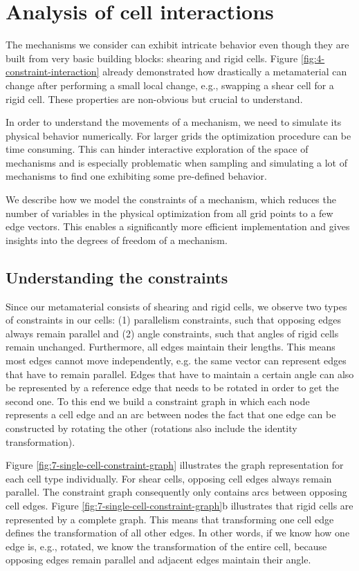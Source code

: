 \section{Analysis of cell interactions}

The mechanisms we consider can exhibit intricate behavior even though they are built from very basic building blocks: shearing and rigid cells. Figure \ref{fig:4-constraint-interaction} already demonstrated how drastically a metamaterial can change after performing a small local change, e.g., swapping a shear cell for a rigid cell. These properties are non-obvious but crucial to understand.

In order to understand the movements of a mechanism, we need to simulate its physical behavior numerically. For larger grids the optimization procedure can be time consuming. This can hinder interactive exploration of the space of mechanisms and is especially problematic when sampling and simulating a lot of mechanisms to find one exhibiting some pre-defined behavior.

We describe how we model the constraints of a mechanism, which reduces the number of variables in the physical optimization from all grid points to a few edge vectors. This enables a significantly more efficient implementation and gives insights into the degrees of freedom of a mechanism.


\subsection{Understanding the constraints}
\label{section:graph}

Since our metamaterial consists of shearing and rigid cells, we observe two types of constraints in our cells: (1) parallelism constraints, such that opposing edges always remain parallel and (2) angle constraints, such that angles of rigid cells remain unchanged. Furthermore, all edges maintain their lengths. 
This means most edges cannot move independently, e.g. the same vector can represent edges that have to remain parallel. Edges that have to maintain a certain angle can also be represented by a reference edge that needs to be rotated in order to get the second one. To this end we build a constraint graph in which each node represents a cell edge and an arc between nodes the fact that one edge can be constructed by rotating the other (rotations also include the identity transformation).

Figure \ref{fig:7-single-cell-constraint-graph} illustrates the graph representation for each cell type individually. For shear cells, opposing cell edges always remain parallel. The constraint graph consequently only contains arcs between opposing cell edges. Figure \ref{fig:7-single-cell-constraint-graph}b illustrates that rigid cells are represented by a complete graph. This means that transforming one cell edge defines the transformation of all other edges. In other words, if we know how one edge is, e.g., rotated, we know the transformation of the entire cell, because opposing edges remain parallel and adjacent edges maintain their angle.

